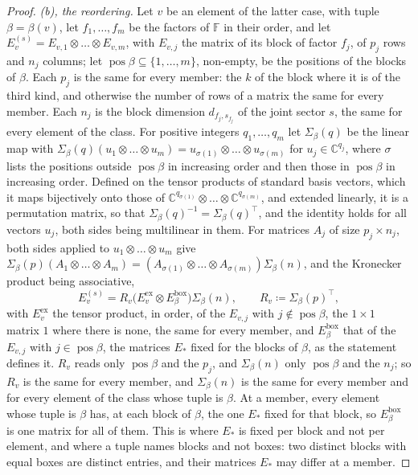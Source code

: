 \begin{proof}
\emph{(b), the reordering.} Let $v$ be an element of the latter case, with
tuple $\beta=\beta(v)$, let $f_1,\dots,f_m$ be the factors of $\mathbb{F}$ in
their order, and let $E^{(s)}_v=E_{v,1}\otimes\dots\otimes E_{v,m}$, with
$E_{v,j}$ the matrix of its block of factor $f_j$, of $p_j$ rows and $n_j$
columns; let $\operatorname{pos}\beta\subseteq\{1,\dots,m\}$, non-empty, be
the positions of the blocks of $\beta$. Each $p_j$ is the same for every
member: the $k$ of the block where it is of the third kind, and otherwise
the number of rows of a matrix the same for every member. Each $n_j$ is the
block dimension $d_{f_j,s_{f_j}}$ of the joint sector $s$, the same for
every element of the class. For positive integers $q_1,\dots,q_m$ let
$\Sigma_{\beta}(q)$ be the linear map with
$\Sigma_{\beta}(q)(u_1\otimes\dots\otimes u_m)=u_{\sigma(1)}\otimes\dots
\otimes u_{\sigma(m)}$ for $u_j\in\mathbb{C}^{q_j}$, where $\sigma$ lists the
positions outside $\operatorname{pos}\beta$ in increasing order and then
those in $\operatorname{pos}\beta$ in increasing order. Defined on the
tensor products of standard basis vectors, which it maps bijectively onto
those of $\mathbb{C}^{q_{\sigma(1)}}\otimes\dots\otimes\mathbb{C}^{q_{\sigma(m)}}$,
and extended linearly, it is a permutation matrix, so that
$\Sigma_{\beta}(q)^{-1}=\Sigma_{\beta}(q)^{\top}$, and the identity holds for
all vectors $u_j$, both sides being multilinear in them. For matrices $A_j$
of size $p_j\times n_j$, both sides applied to $u_1\otimes\dots\otimes u_m$
give $\Sigma_{\beta}(p)(A_1\otimes\dots\otimes A_m)=(A_{\sigma(1)}\otimes
\dots\otimes A_{\sigma(m)})\Sigma_{\beta}(n)$, and the Kronecker product
being associative,
\begin{equation*}
  E^{(s)}_v=R_v\big(E^{\mathrm{ex}}_v\otimes E^{\mathrm{box}}_{\beta}\big)
  \Sigma_{\beta}(n),\qquad R_v\coloneqq\Sigma_{\beta}(p)^{\top},
\end{equation*}
with $E^{\mathrm{ex}}_v$ the tensor product, in order, of the $E_{v,j}$ with
$j\notin\operatorname{pos}\beta$, the $1\times1$ matrix $1$ where there is
none, the same for every member, and $E^{\mathrm{box}}_{\beta}$ that of the
$E_{v,j}$ with $j\in\operatorname{pos}\beta$, the matrices $E_{*}$ fixed for
the blocks of $\beta$, as the statement defines it. $R_v$ reads only
$\operatorname{pos}\beta$ and the $p_j$, and $\Sigma_{\beta}(n)$ only
$\operatorname{pos}\beta$ and the $n_j$; so $R_v$ is the same for every
member, and $\Sigma_{\beta}(n)$ is the same for every member and for every
element of the class whose tuple is $\beta$. At a member, every element whose
tuple is $\beta$ has, at each block of $\beta$, the one $E_{*}$ fixed for that
block, so $E^{\mathrm{box}}_{\beta}$ is one matrix for all of them. This is
where $E_{*}$ is fixed per block and not per element, and where a tuple names
blocks and not boxes: two distinct blocks with equal boxes are distinct
entries, and their matrices $E_{*}$ may differ at a member.


\end{proof}
